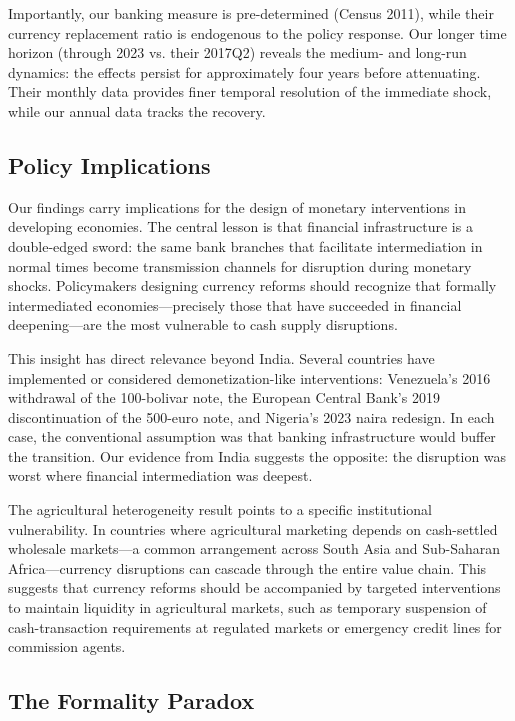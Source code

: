 \documentclass[12pt]{article}
\begin{document}
Importantly, our banking measure is pre-determined (Census 2011), while their currency replacement ratio is endogenous to the policy response. Our longer time horizon (through 2023 vs. their 2017Q2) reveals the medium- and long-run dynamics: the effects persist for approximately four years before attenuating. Their monthly data provides finer temporal resolution of the immediate shock, while our annual data tracks the recovery.

\subsection{Policy Implications}

Our findings carry implications for the design of monetary interventions in developing economies. The central lesson is that financial infrastructure is a double-edged sword: the same bank branches that facilitate intermediation in normal times become transmission channels for disruption during monetary shocks. Policymakers designing currency reforms should recognize that formally intermediated economies---precisely those that have succeeded in financial deepening---are the most vulnerable to cash supply disruptions.

This insight has direct relevance beyond India. Several countries have implemented or considered demonetization-like interventions: Venezuela's 2016 withdrawal of the 100-bolivar note, the European Central Bank's 2019 discontinuation of the 500-euro note, and Nigeria's 2023 naira redesign. In each case, the conventional assumption was that banking infrastructure would buffer the transition. Our evidence from India suggests the opposite: the disruption was worst where financial intermediation was deepest.

The agricultural heterogeneity result points to a specific institutional vulnerability. In countries where agricultural marketing depends on cash-settled wholesale markets---a common arrangement across South Asia and Sub-Saharan Africa---currency disruptions can cascade through the entire value chain. This suggests that currency reforms should be accompanied by targeted interventions to maintain liquidity in agricultural markets, such as temporary suspension of cash-transaction requirements at regulated markets or emergency credit lines for commission agents.

\subsection{The Formality Paradox}
\end{document}
